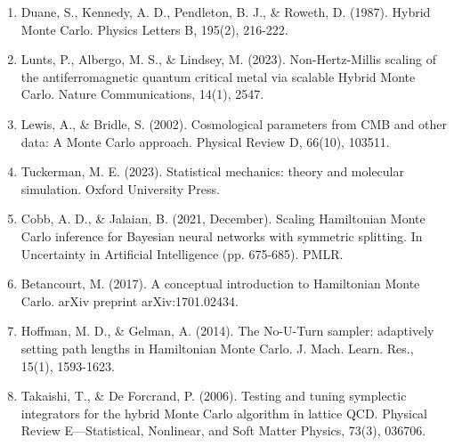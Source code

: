 \begin{talk}
\begin{enumerate}
\item[{[1]}] Duane, S., Kennedy, A. D., Pendleton, B. J., \& Roweth, D. (1987). Hybrid Monte Carlo. Physics Letters B, 195(2), 216-222.
\item[{[2]}] Lunts, P., Albergo, M. S., \& Lindsey, M. (2023). Non-Hertz-Millis scaling of the antiferromagnetic quantum critical metal via scalable Hybrid Monte Carlo. Nature Communications, 14(1), 2547.
\item[{[3]}] Lewis, A., \& Bridle, S. (2002). Cosmological parameters from CMB and other data: A Monte Carlo approach. Physical Review D, 66(10), 103511.
\item[{[4]}] Tuckerman, M. E. (2023). Statistical mechanics: theory and molecular simulation. Oxford University Press.
\item[{[5]}] Cobb, A. D., \& Jalaian, B. (2021, December). Scaling Hamiltonian Monte Carlo inference for Bayesian neural networks with symmetric splitting. In Uncertainty in Artificial Intelligence (pp. 675-685). PMLR.
\item[{[6]}] Betancourt, M. (2017). A conceptual introduction to Hamiltonian Monte Carlo. arXiv preprint arXiv:1701.02434.
\item[{[7]}] Hoffman, M. D., \& Gelman, A. (2014). The No-U-Turn sampler: adaptively setting path lengths in Hamiltonian Monte Carlo. J. Mach. Learn. Res., 15(1), 1593-1623.
\item[{[8]}] Takaishi, T., \& De Forcrand, P. (2006). Testing and tuning symplectic integrators for the hybrid Monte Carlo algorithm in lattice QCD. Physical Review E—Statistical, Nonlinear, and Soft Matter Physics, 73(3), 036706.
\end{enumerate}


\end{talk}

